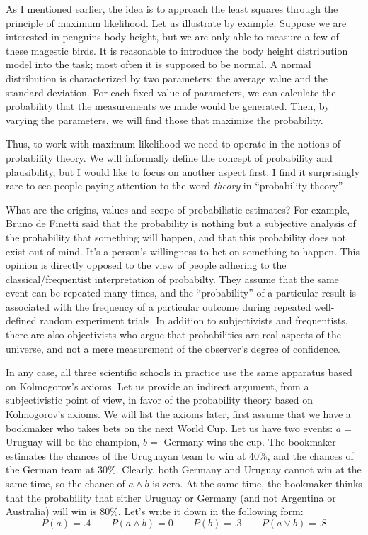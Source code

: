 \documentclass[notitlepage,oneside]{book}
\begin{document}
As I mentioned earlier, the idea is to approach the least squares through the principle of maximum likelihood. 
Let us illustrate by example. 
Suppose we are interested in penguins body height, but we are only able to measure a few of these magestic birds.
It is reasonable to introduce the body height distribution model into the task; most often it is supposed to be normal.
A normal distribution is characterized by two parameters: the average value and the standard deviation.
For each fixed value of parameters, we can calculate the probability that the measurements we made would be generated.
Then, by varying the parameters, we will find those that maximize the probability.

Thus, to work with maximum likelihood we need to operate in the notions of probability theory.
We will informally define the concept of probability and plausibility,
but I would like to focus on another aspect first.
I find it surprisingly rare to see people paying attention to the word \textit{theory} in ``probability theory''.

What are the origins, values and scope of probabilistic estimates? 
For example, Bruno de Finetti said that the probability is nothing but a subjective analysis of the probability that something will happen, 
and that this probability does not exist out of mind. 
It's a person's willingness to bet on something to happen. 
This opinion is directly opposed to the view of people adhering to the classical/frequentist interpretation of probabilty.
They assume that the same event can be repeated many times, and the ``probability'' of a particular result is associated with 
the frequency of a particular outcome during repeated well-defined random experiment trials.
In addition to subjectivists and frequentists, there are also objectivists who argue that probabilities are real aspects of the universe, 
and not a mere measurement of the observer's degree of confidence.

In any case, all three scientific schools in practice use the same apparatus based on Kolmogorov's axioms.
Let us provide an indirect argument, from a subjectivistic point of view, in favor of the probability theory based on Kolmogorov's axioms.
We will list the axioms later, first assume that we have a bookmaker who takes bets on the next World Cup. 
Let us have two events: $a=$ Uruguay will be the champion, $b=$ Germany wins the cup.
The bookmaker estimates the chances of the Uruguayan team to win at 40\%, and the chances of the German team at 30\%.
Clearly, both Germany and Uruguay cannot win at the same time, so the chance of $a\wedge b$ is zero. 
At the same time, the bookmaker thinks that the probability that either Uruguay or Germany (and not Argentina or Australia) will win is 80\%.
Let's write it down in the following form:
$$P(a) = .4  \qquad  P(a\wedge b) = 0 \qquad P(b) = .3 \qquad P(a\vee b) = .8$$
\end{document}
